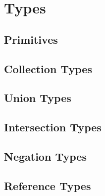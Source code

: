 \chapter{Types}
\section{Primitives}
\section{Collection Types}
\section{Union Types}
\section{Intersection Types}
\section{Negation Types}
\section{Reference Types}
